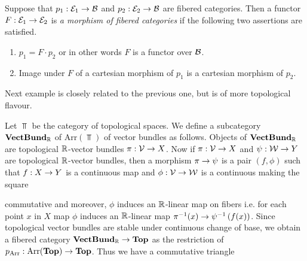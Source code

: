 \begin{definition}
Suppose that $p_1:{\mathcal E}_1\rightarrow {\mathcal B}$ and $p_2:{\mathcal E}_2\rightarrow {\mathcal B}$ are fibered categories. Then a functor $F:{\mathcal E}_1\rightarrow {\mathcal E}_2$ is \textit{a morphism of fibered categories} if the following two assertions are satisfied.
\begin{enumerate}[label=\textbf{(\arabic*)}, leftmargin=3.0em]
\item $p_1 = F\cdot p_2$ or in other words $F$ is a functor over ${\mathcal B}$.
\item Image under $F$ of a cartesian morphism of $p_1$ is a cartesian morphism of $p_2$.
\end{enumerate}
\end{definition}
\noindent
Next example is closely related to the previous one, but is of more topological flavour.

\begin{example}\label{example:the_fibered_category_of_vector_bundles}
Let $\Top$ be the category of topological spaces. We define a subcategory $\mathbf{VectBund}_{{\mathbb R}}$ of $\mathrm{Arr}(\Top)$ of vector bundles as follows. Objects of $\mathbf{VectBund}_{{\mathbb R}}$ are topological ${\mathbb R}$-vector bundles $\pi:{\mathcal V} \rightarrow X$. Now if $\pi:{\mathcal V} \rightarrow X$ and $\psi:{\mathcal W} \rightarrow Y$ are topological ${\mathbb R}$-vector bundles, then a morphism $\pi\rightarrow \psi$ is a pair $(f,\phi)$ such that $f:X\rightarrow Y$ is a continuous map and $\phi:{\mathcal V} \rightarrow {\mathcal W}$ is a continuous making the square
\begin{center}
\end{center}
commutative and moreover, $\phi$ induces an ${\mathbb R}$-linear map on fibers i.e. for each point $x$ in $X$ map $\phi$ induces an ${\mathbb R}$-linear map $\pi^{-1}(x)\rightarrow \psi^{-1}\left(f(x)\right)$. Since topological vector bundles are stable under continuous change of base, we obtain a fibered category $\mathbf{VectBund}_{{\mathbb R}}\rightarrow \mathbf{Top}$ as the restriction of $p_{\mathrm{Arr}}:\mathrm{Arr}(\mathbf{Top})\rightarrow \mathbf{Top}$. Thus we have a commutative triangle

\end{example}
